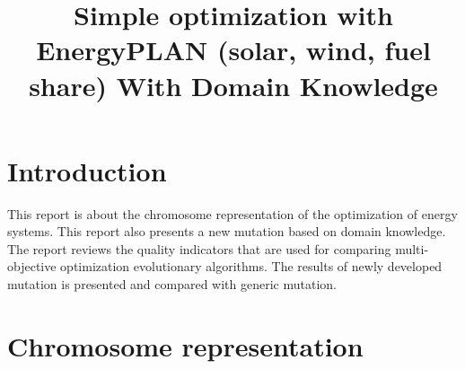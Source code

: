\documentclass{article}
\begin{document}
\title{Simple optimization with EnergyPLAN (solar, wind, fuel share) With Domain Knowledge}
\maketitle

\section{Introduction}

This report is about the chromosome representation of the optimization of energy systems. This report also presents a  new mutation based on domain knowledge. 
The report reviews the quality indicators that are used for comparing  multi-objective optimization evolutionary algorithms. 
The results of newly developed mutation is presented and compared with generic mutation.
 

\section{Chromosome representation}
\end{document}

